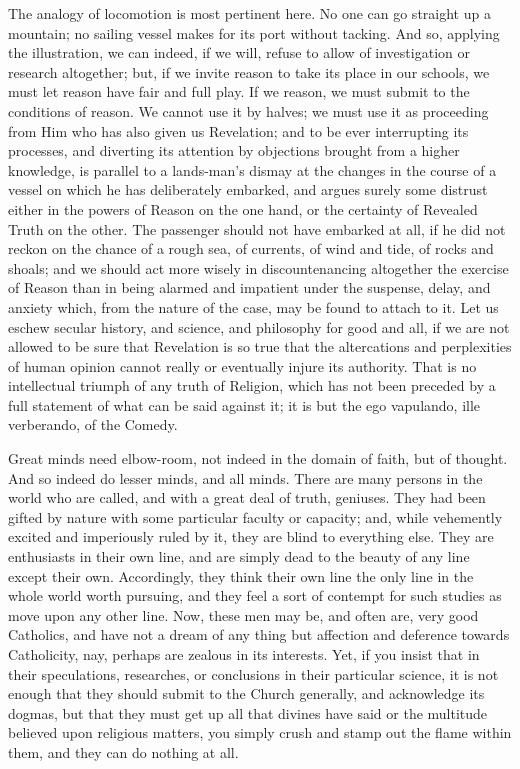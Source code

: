 The analogy of locomotion is most pertinent here. No one can go
straight up a mountain; no sailing vessel makes for its port without
tacking. And so, applying the illustration, we can indeed, if we will,
refuse to allow of investigation or research altogether; but, if we
invite reason to take its place in our schools, we must let reason
have fair and full play. If we reason, we must submit to the
conditions of reason. We cannot use it by halves; we must use it as
proceeding from Him who has also given us Revelation; and to be ever
interrupting its processes, and diverting its attention by objections
brought from a higher knowledge, is parallel to a lands-man's dismay
at the changes in the course of a vessel on which he has deliberately
embarked, and argues surely some distrust either in the powers of
Reason on the one hand, or the certainty of Revealed Truth on the
other. The passenger should not have embarked at all, if he did not
reckon on the chance of a rough sea, of currents, of wind and tide, of
rocks and shoals; and we should act more wisely in discountenancing
altogether the exercise of Reason than in being alarmed and impatient
under the suspense, delay, and anxiety which, from the nature of the
case, may be found to attach to it. Let us eschew secular history, and
science, and philosophy for good and all, if we are not allowed to be
sure that Revelation is so true that the altercations and perplexities
of human opinion cannot really or eventually injure its authority.
That is no intellectual triumph of any truth of Religion, which has
not been preceded by a full statement of what can be said
against it; it is but the ego vapulando, ille verberando, of the
Comedy.

Great minds need elbow-room, not indeed in the domain of faith, but
of thought. And so indeed do lesser minds, and all minds. There are
many persons in the world who are called, and with a great deal of
truth, geniuses. They had been gifted by nature with some particular
faculty or capacity; and, while vehemently excited and imperiously
ruled by it, they are blind to everything else. They are enthusiasts
in their own line, and are simply dead to the beauty of any line
except their own. Accordingly, they think their own line the only line
in the whole world worth pursuing, and they feel a sort of contempt
for such studies as move upon any other line. Now, these men may be,
and often are, very good Catholics, and have not a dream of any thing
but affection and deference towards Catholicity, nay, perhaps are
zealous in its interests. Yet, if you insist that in their
speculations, researches, or conclusions in their particular science,
it is not enough that they should submit to the Church generally, and
acknowledge its dogmas, but that they must get up all that divines
have said or the multitude believed upon religious matters, you simply
crush and stamp out the flame within them, and they can do nothing at
all.

